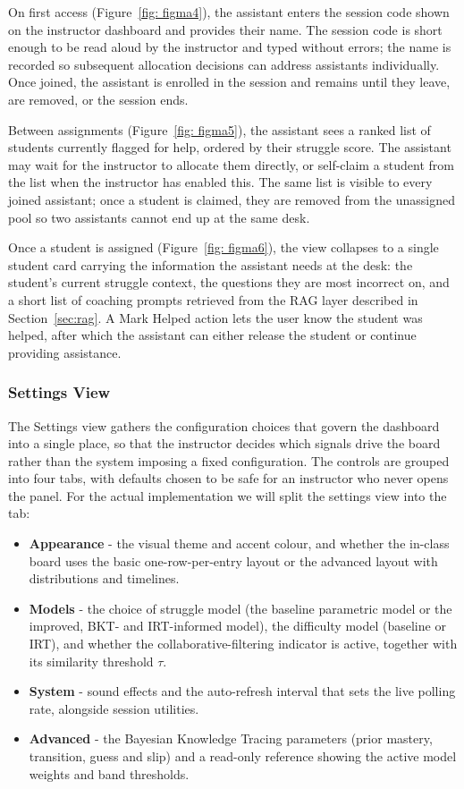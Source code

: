 On first access (Figure~\ref{fig: figma4}), the assistant enters the session code shown on the instructor dashboard and provides their name. The session code is short enough to be read aloud by the instructor and typed without errors; the name is recorded so subsequent allocation decisions can address assistants individually. Once joined, the assistant is enrolled in the session and remains until they leave, are removed, or the session ends.

Between assignments (Figure~\ref{fig: figma5}), the assistant sees a ranked list of students currently flagged for help, ordered by their struggle score. The assistant may wait for the instructor to allocate them directly, or self-claim a student from the list when the instructor has enabled this. The same list is visible to every joined assistant; once a student is claimed, they are removed from the unassigned pool so two assistants cannot end up at the same desk.

Once a student is assigned (Figure~\ref{fig: figma6}), the view collapses to a single student card carrying the information the assistant needs at the desk: the student's current struggle context, the questions they are most incorrect on, and a short list of coaching prompts retrieved from the RAG layer described in Section~\ref{sec:rag}. A Mark Helped action lets the user know the student was helped, after which the assistant can either release the student or continue providing assistance.

\subsubsection{Settings View}
The Settings view gathers the configuration choices that govern the dashboard into a single place, so that the instructor decides which signals drive the board rather than the system imposing a fixed configuration. The controls are grouped into four tabs, with defaults chosen to be safe for an instructor who never opens the panel. For the actual implementation we will split the settings view into the tab:

\begin{itemize}
    \item \textbf{Appearance} - the visual theme and accent colour, and whether the in-class board uses the basic one-row-per-entry layout or the advanced layout with distributions and timelines.
    \item \textbf{Models} - the choice of struggle model (the baseline parametric model or the improved, BKT- and IRT-informed model), the difficulty model (baseline or IRT), and whether the collaborative-filtering indicator is active, together with its similarity threshold $\tau$.
    \item \textbf{System} - sound effects and the auto-refresh interval that sets the live polling rate, alongside session utilities.
    \item \textbf{Advanced} - the Bayesian Knowledge Tracing parameters (prior mastery, transition, guess and slip) and a read-only reference showing the active model weights and band thresholds.
\end{itemize}

